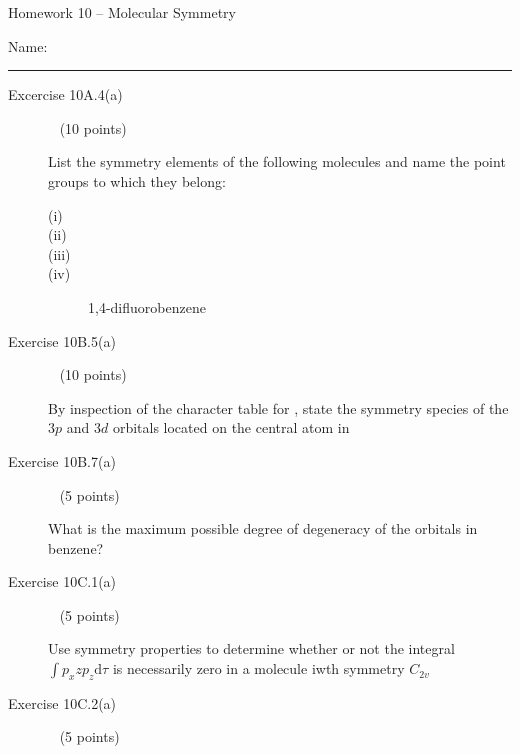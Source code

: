 \documentclass[10pt, letterpaper]{memoir}
\begin{document}
\begin{center}
	{\large Homework 10 -- Molecular Symmetry}
\end{center}

Name: \rule[-.1mm]{15em}{0.1pt}

\begin{description}
	\item [Excercise 10A.4(a)] ~ (10 points)

	      List the symmetry elements of the following molecules and name the point groups to which they belong:
	      \begin{description}
		      \item [(i)]   %

		            \vspace{2em}
		      \item [(ii)]   %

		            \vspace{2em}
		      \item [(iii)]   %

		            \vspace{2em}
		      \item [(iv)] 1,4-difluorobenzene  %
	      \end{description}

	      \vspace{2em}
	\item [Exercise 10B.5(a)] ~ (10 points)

	      By inspection of the character table for , state the symmetry species of the $3p$ and $3d$ orbitals located on the central  atom in   %

	      \vspace{10em}
	\item [Exercise 10B.7(a)] ~ (5 points)

	      What is the maximum possible degree of degeneracy of the orbitals in benzene?  %

	      \vspace{5em}
	\item [Exercise 10C.1(a)] ~ (5 points)

	      Use symmetry properties to determine whether or not the integral $\int p_xzp_z\mathrm{d}\tau$ is necessarily zero in a molecule iwth symmetry $C_{2v}$

	      \vspace{5em}
	\item [Exercise 10C.2(a)] ~ (5 points)


\end{description}
\end{document}
